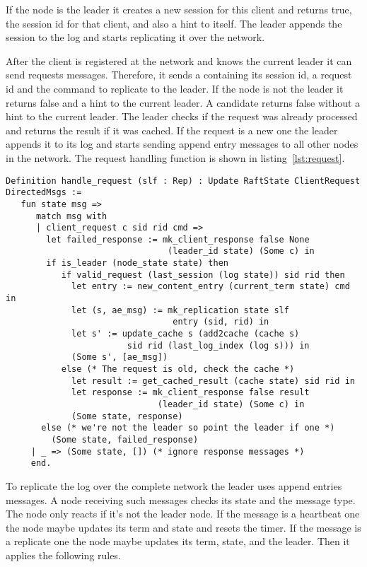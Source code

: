 If the node is the leader it creates a new session for this client and
returns true, the session id for that client, and also a hint to itself.
The leader appends the session to the log and starts replicating it
over the network.

After the client is registered at the network and knows the current leader
it can send requests messages. Therefore, it sends a 
containing its session id, a request id and the command to replicate
to the leader. If the node is not the leader it returns false and a hint
to the current leader. A candidate returns false without a hint to
the current leader. The leader checks if the request was already processed
and returns the result if it was cached. If the request is a new one the
leader appends it to its log and starts sending append entry messages
to all other nodes in the network. The request handling function is shown in listing~\ref{lst:request}.

\begin{lstlisting}[style=coq,label=lst:request,
caption=How a node handles a client request.]
Definition handle_request (slf : Rep) : Update RaftState ClientRequest DirectedMsgs :=
   fun state msg =>
      match msg with
      | client_request c sid rid cmd =>
        let failed_response := mk_client_response false None 
                                (leader_id state) (Some c) in
        if is_leader (node_state state) then
           if valid_request (last_session (log state)) sid rid then
             let entry := new_content_entry (current_term state) cmd in
             let (s, ae_msg) := mk_replication state slf 
                                 entry (sid, rid) in
             let s' := update_cache s (add2cache (cache s) 
                        sid rid (last_log_index (log s))) in
             (Some s', [ae_msg])
           else (* The request is old, check the cache *)
             let result := get_cached_result (cache state) sid rid in
             let response := mk_client_response false result 
                              (leader_id state) (Some c) in
             (Some state, response)
       else (* we're not the leader so point the leader if one *)
         (Some state, failed_response)
     | _ => (Some state, []) (* ignore response messages *)
     end.
\end{lstlisting}

To replicate the log over the complete network the leader uses
append entries messages. A node receiving such messages checks its
state and the message type. The node only reacts if it's not the leader node.
If the message is a heartbeat one the node maybe updates its term and
state and resets the timer. 
If the message is a replicate one the node maybe updates its term, state,
and the leader. Then it applies the following rules.

